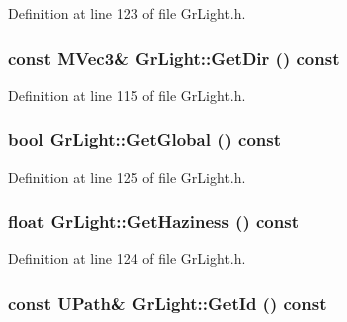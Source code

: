 Definition at line 123 of file GrLight.h.\hypertarget{class_gr_light_1b6604c1d7bf5d5aab3d99969b114f67}{
\subsubsection[{GetDir}]{\setlength{\rightskip}{0pt plus 5cm}const {\bf MVec3}\& GrLight::GetDir () const}}
\label{class_gr_light_1b6604c1d7bf5d5aab3d99969b114f67}




Definition at line 115 of file GrLight.h.\hypertarget{class_gr_light_e39e45c0786bc0331f102c182454fdea}{
\subsubsection[{GetGlobal}]{\setlength{\rightskip}{0pt plus 5cm}bool GrLight::GetGlobal () const}}
\label{class_gr_light_e39e45c0786bc0331f102c182454fdea}




Definition at line 125 of file GrLight.h.\hypertarget{class_gr_light_173d1a635f72cd1788c8b3e61492f01a}{
\subsubsection[{GetHaziness}]{\setlength{\rightskip}{0pt plus 5cm}float GrLight::GetHaziness () const}}
\label{class_gr_light_173d1a635f72cd1788c8b3e61492f01a}




Definition at line 124 of file GrLight.h.\hypertarget{class_gr_light_352d37d4c1b11c0d33e34a314367d468}{
\subsubsection[{GetId}]{\setlength{\rightskip}{0pt plus 5cm}const {\bf UPath}\& GrLight::GetId () const}}
\label{class_gr_light_352d37d4c1b11c0d33e34a314367d468}




